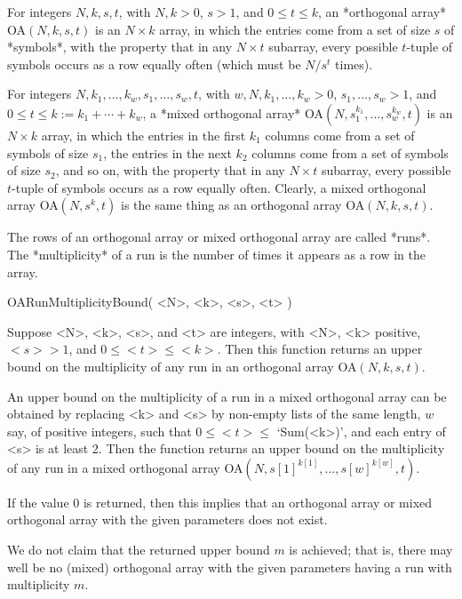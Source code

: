 
For integers $N,k,s,t$, with $N,k>0$, $s>1$, and $0\le t\le k$, 
an *orthogonal array* 
OA$(N,k,s,t)$ is an $N\times k$ array, in which the entries come from a
set of size $s$ of *symbols*, with the property that in any $N\times t$
subarray, every possible $t$-tuple of symbols occurs as a row equally
often (which must be $N/s^t$ times).

For integers $N,k_1,\ldots,k_w,s_1,\ldots,s_w,t$, with
$w,N,k_1,\ldots,k_w>0$, $s_1,\ldots,s_w>1$, and $0\le t\le k:=k_1+\cdots+k_w$,
a *mixed orthogonal array* 
OA$(N,s_1^{k_1},\ldots,s_w^{k_w},t)$ is an $N\times k$
array, in which the entries in the first
$k_1$ columns come from a set of symbols of size $s_1$, the entries
in the next $k_2$ columns come from a set of symbols of size $s_2$,
and so on, with the property that in any $N\times t$ subarray, every
possible $t$-tuple of symbols occurs as a row equally often.
Clearly, a mixed orthogonal array OA$(N,s^k,t)$ is the same thing as an
orthogonal array OA$(N,k,s,t)$.  

The rows of an orthogonal array or mixed orthogonal array are called *runs*. 
The *multiplicity* of a run is the number of times it appears as a row
in the array.


\>OARunMultiplicityBound( <N>, <k>, <s>, <t> )

Suppose <N>, <k>, <s>, and <t> are integers, with <N>, <k> positive,
$<s> > 1$, and $0\le <t>\le <k>$.  Then this function returns an upper
bound on the multiplicity of any run in an orthogonal array OA$(N,k,s,t)$.

An upper bound on the multiplicity of a run in a mixed orthogonal array
can be obtained by replacing <k> and <s> by non-empty lists of the same
length, $w$ say, of positive integers, such that $0\le <t> \le$ `Sum(<k>)',
and each entry of <s> is at least 2.  Then the function returns an
upper bound on the multiplicity of any run in a mixed orthogonal array
OA$(N,s[1]^{k[1]},...,s[w]^{k[w]},t)$.

If the value $0$ is returned, then this implies that an orthogonal array
or mixed orthogonal array with the given parameters does not exist.

We do not claim that the returned upper bound $m$ is achieved; that
is, there may well be no (mixed) orthogonal array with the given
parameters having a run with multiplicity $m$.

